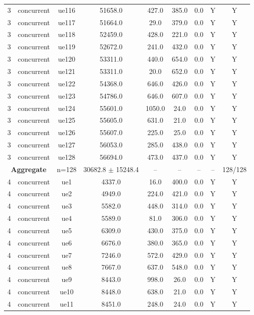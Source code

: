 \begin{table}[ht]
\begin{tabular}{|c|c|c|c|c|c|c|c|c|}
3 & concurrent & ue116 & 51658.0 & 427.0 & 385.0 & 0.0 & Y & Y \\
3 & concurrent & ue117 & 51664.0 & 29.0 & 379.0 & 0.0 & Y & Y \\
3 & concurrent & ue118 & 52459.0 & 428.0 & 221.0 & 0.0 & Y & Y \\
3 & concurrent & ue119 & 52672.0 & 241.0 & 432.0 & 0.0 & Y & Y \\
3 & concurrent & ue120 & 53311.0 & 440.0 & 654.0 & 0.0 & Y & Y \\
3 & concurrent & ue121 & 53311.0 & 20.0 & 652.0 & 0.0 & Y & Y \\
3 & concurrent & ue122 & 54368.0 & 646.0 & 426.0 & 0.0 & Y & Y \\
3 & concurrent & ue123 & 54786.0 & 646.0 & 607.0 & 0.0 & Y & Y \\
3 & concurrent & ue124 & 55601.0 & 1050.0 & 24.0 & 0.0 & Y & Y \\
3 & concurrent & ue125 & 55605.0 & 631.0 & 21.0 & 0.0 & Y & Y \\
3 & concurrent & ue126 & 55607.0 & 225.0 & 25.0 & 0.0 & Y & Y \\
3 & concurrent & ue127 & 56053.0 & 285.0 & 438.0 & 0.0 & Y & Y \\
3 & concurrent & ue128 & 56694.0 & 473.0 & 437.0 & 0.0 & Y & Y \\
\multicolumn{2}{|c|}{\textbf{Aggregate}} & n=128 & 30682.8 $\pm$ 15248.4 & -- & -- & -- & -- & 128/128 \\
\hline
4 & concurrent & ue1 & 4337.0 & 16.0 & 400.0 & 0.0 & Y & Y \\
4 & concurrent & ue2 & 4949.0 & 224.0 & 421.0 & 0.0 & Y & Y \\
4 & concurrent & ue3 & 5582.0 & 448.0 & 314.0 & 0.0 & Y & Y \\
4 & concurrent & ue4 & 5589.0 & 81.0 & 306.0 & 0.0 & Y & Y \\
4 & concurrent & ue5 & 6309.0 & 430.0 & 375.0 & 0.0 & Y & Y \\
4 & concurrent & ue6 & 6676.0 & 380.0 & 365.0 & 0.0 & Y & Y \\
4 & concurrent & ue7 & 7246.0 & 572.0 & 429.0 & 0.0 & Y & Y \\
4 & concurrent & ue8 & 7667.0 & 637.0 & 548.0 & 0.0 & Y & Y \\
4 & concurrent & ue9 & 8443.0 & 998.0 & 26.0 & 0.0 & Y & Y \\
4 & concurrent & ue10 & 8448.0 & 638.0 & 21.0 & 0.0 & Y & Y \\
4 & concurrent & ue11 & 8451.0 & 248.0 & 24.0 & 0.0 & Y & Y \\

\end{tabular}
\end{table}
